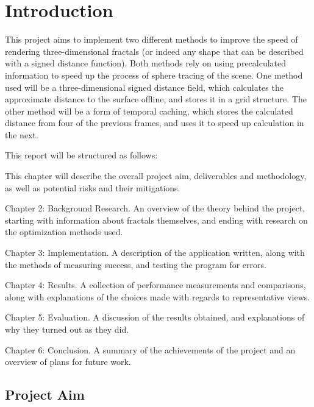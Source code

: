 \chapter{Introduction}
\label{chapter:introduction}

This project aims to implement two different methods to improve the speed of rendering three-dimensional fractals (or indeed any shape that can be described with a signed distance function). Both methods rely on using precalculated information to speed up the process of sphere tracing of the scene. One method used will be a three-dimensional signed distance field, which calculates the approximate distance to the surface offline, and stores it in a grid structure. The other method will be a form of temporal caching, which stores the calculated distance from four of the previous frames, and uses it to speed up calculation in the next.\newline

This report will be structured as follows:\newline

This chapter will describe the overall project aim, deliverables and methodology, as well as potential risks and their mitigations.\newline

Chapter 2: Background Research. An overview of the theory behind the project, starting with information about fractals themselves, and ending with research on the optimization methods used.\newline

Chapter 3: Implementation. A description of the application written, along with the methods of measuring success, and testing the program for errors.\newline

Chapter 4: Results. A collection of performance measurements and comparisons, along with explanations of the choices made with regards to representative views.\newline

Chapter 5: Evaluation. A discussion of the results obtained, and explanations of why they turned out as they did.\newline

Chapter 6: Conclusion. A summary of the achievements of the project and an overview of plans for future work.

\section{Project Aim}

